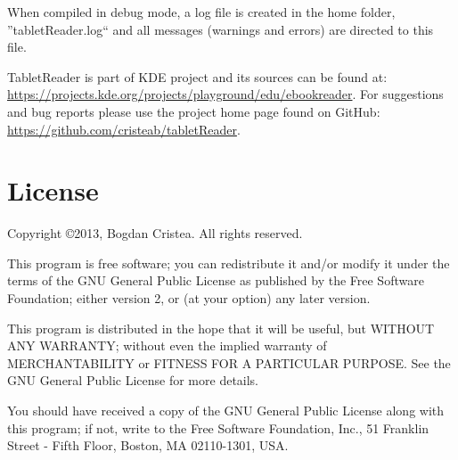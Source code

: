 \documentclass[journal,12pt]{IEEEtran}
\begin{document}
When compiled in debug mode, a log file is created in the home folder, ''tabletReader.log`` and all messages (warnings and errors) are directed to this file.

TabletReader is part of KDE project and its sources can be found at: 
\url{https://projects.kde.org/projects/playground/edu/ebookreader}. For 
suggestions and bug reports please use the project home page found on GitHub: 
\url{https://github.com/cristeab/tabletReader}.

\section{License}
 Copyright \copyright 2013, Bogdan Cristea. All rights reserved.
 
 This program is free software; you can redistribute it and/or modify  it under the terms of the GNU General Public License as published by the Free Software Foundation; either version 2, or (at your option)  any later version.
 
 This program is distributed in the hope that it will be useful,  but WITHOUT ANY WARRANTY; without even the implied warranty of
 MERCHANTABILITY or FITNESS FOR A PARTICULAR PURPOSE.  See the  GNU General Public License for more details.
 
 You should have received a copy of the GNU General Public License along with this program; if not, write to the Free Software
 Foundation, Inc., 51 Franklin Street - Fifth Floor, Boston, MA 02110-1301, USA.
\end{document}
